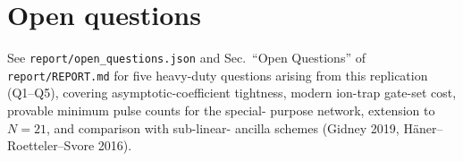 \documentclass[11pt]{article}
\begin{document}
\section{Open questions}
See \texttt{report/open\_questions.json} and Sec.~``Open Questions'' of
\texttt{report/REPORT.md} for five heavy-duty questions arising from this
replication (Q1--Q5), covering asymptotic-coefficient tightness, modern
ion-trap gate-set cost, provable minimum pulse counts for the special-
purpose network, extension to $N=21$, and comparison with sub-linear-
ancilla schemes (Gidney 2019, H\"{a}ner--Roetteler--Svore 2016).
\end{document}

